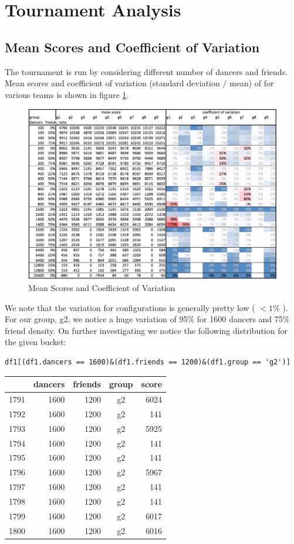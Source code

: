 \section{Tournament Analysis}\label{tournament-analysis}

\subsection{Mean Scores and Coefficient of
Variation}\label{mean-scores-and-coefficient-of-variation}

The tournament is run by considering different number of dancers and
friends. Mean scores and coefficient of variation (standard deviation /
mean) of for various teams is shown in figure \ref{img-mean-cov}.

\begin{figure}[htbp]
\centering
\includegraphics{imgs/mean-cov.png}
\caption{Mean Scores and Coefficient of Variation\label{img-mean-cov}}
\end{figure}

We note that the variation for configurations is generally pretty low (
\(< 1\%\) ). For our group, g2, we notice a huge variation of 95\% for
1600 dancers and 75\% friend density. On further investigating we notice
the following distribution for the given bucket:

\begin{verbatim}
df1[(df1.dancers == 1600)&(df1.friends == 1200)&(df1.group == 'g2')]
\end{verbatim}

\begin{longtable}[c]{@{}lrrcr@{}}
\toprule
& dancers & friends & group & score\tabularnewline
\midrule
\endhead
1791 & 1600 & 1200 & g2 & 6024\tabularnewline
1792 & 1600 & 1200 & g2 & 141\tabularnewline
1793 & 1600 & 1200 & g2 & 5925\tabularnewline
1794 & 1600 & 1200 & g2 & 141\tabularnewline
1795 & 1600 & 1200 & g2 & 141\tabularnewline
1796 & 1600 & 1200 & g2 & 5967\tabularnewline
1797 & 1600 & 1200 & g2 & 141\tabularnewline
1798 & 1600 & 1200 & g2 & 141\tabularnewline
1799 & 1600 & 1200 & g2 & 6017\tabularnewline
1800 & 1600 & 1200 & g2 & 6016\tabularnewline
\bottomrule
\end{longtable}

